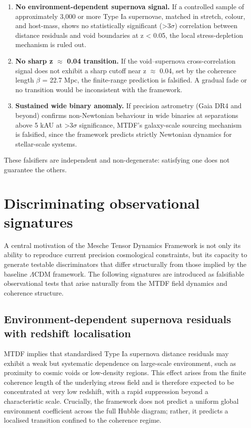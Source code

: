 \documentclass[11pt,a4paper]{article}
\begin{document}
\begin{enumerate}
  \item \textbf{No environment-dependent supernova signal.} If a controlled sample of approximately 3,000 or more Type Ia supernovae, matched in stretch, colour, and host-mass, shows no statistically significant (>3$\sigma$) correlation between distance residuals and void boundaries at z < 0.05, the local stress-depletion mechanism is ruled out.
  \item \textbf{No sharp z $\approx$ 0.04 transition.} If the void--supernova cross-correlation signal does not exhibit a sharp cutoff near z $\approx$ 0.04, set by the coherence length $\beta$ = 22.7 Mpc, the finite-range prediction is falsified. A gradual fade or no transition would be inconsistent with the framework.
  \item \textbf{Sustained wide binary anomaly.} If precision astrometry (Gaia DR4 and beyond) confirms non-Newtonian behaviour in wide binaries at separations above 5 kAU at >3$\sigma$ significance, MTDF's galaxy-scale sourcing mechanism is falsified, since the framework predicts strictly Newtonian dynamics for stellar-scale systems.
\end{enumerate}

These falsifiers are independent and non-degenerate: satisfying one does not guarantee the others.

\section{Discriminating observational signatures}
\label{sec:sec10}
A central motivation of the Mesche Tensor Dynamics Framework is not only its ability to reproduce current precision cosmological constraints, but its capacity to generate testable discriminators that differ structurally from those implied by the baseline $\Lambda$CDM framework. The following signatures are introduced as falsifiable observational tests that arise naturally from the MTDF field dynamics and coherence structure.

\subsection{Environment-dependent supernova residuals with redshift localisation}
MTDF implies that standardised Type Ia supernova distance residuals may exhibit a weak but systematic dependence on large-scale environment, such as proximity to cosmic voids or low-density regions. This effect arises from the finite coherence length of the underlying stress field and is therefore expected to be concentrated at very low redshift, with a rapid suppression beyond a characteristic scale. Crucially, the framework does not predict a uniform global environment coefficient across the full Hubble diagram; rather, it predicts a localised transition confined to the coherence regime.
\end{document}
